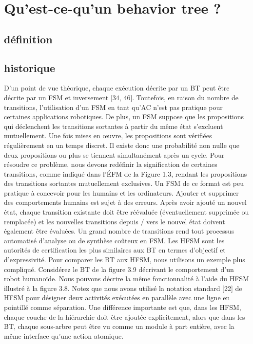 \documentclass[titlepage]{article}
\begin{document}
	\section{Qu'est-ce-qu'un behavior tree ?}
		\subsection{définition}
		\subsection{historique}
			D'un point de vue théorique, chaque exécution décrite par un BT peut être décrite par un FSM et inversement [34, 46]. Toutefois, en raison du nombre de transitions, l'utilisation d'un FSM en tant qu'AC n'est pas pratique pour certaines applications robotiques. De plus, un FSM suppose que les propositions qui déclenchent les transitions sortantes à partir du même état s’excluent mutuellement. Une fois mises en œuvre, les propositions sont vérifiées régulièrement en un temps discret. Il existe donc une probabilité non nulle que deux propositions ou plus se tiennent simultanément après un cycle. Pour résoudre ce problème, nous devons redéfinir la signification de certaines transitions, comme indiqué dans l’ÉFM de la Figure 1.3, rendant les propositions des transitions sortantes mutuellement exclusives. Un FSM de ce format est peu pratique à concevoir pour les humains et les ordinateurs. Ajouter et supprimer des comportements humains est sujet à des erreurs. Après avoir ajouté un nouvel état, chaque transition existante doit être réévaluée (éventuellement supprimée ou remplacée) et les nouvelles transitions depuis / vers le nouvel état doivent également être évaluées. Un grand nombre de transitions rend tout processus automatisé d'analyse ou de synthèse coûteux en FSM.
			Les HFSM sont les autorités de certification les plus similaires aux BT en termes d'objectif et d'expressivité. Pour comparer les BT aux HFSM, nous utilisons un exemple plus compliqué. Considérez le BT de la figure 3.9 décrivant le comportement d’un robot humanoïde. Nous pouvons décrire la même fonctionnalité à l'aide du HFSM illustré à la figure 3.8. Notez que nous avons utilisé la notation standard [22] de HFSM pour désigner deux activités exécutées en parallèle avec une ligne en pointillé comme séparation. Une différence importante est que, dans les HFSM, chaque couche de la hiérarchie doit être ajoutée explicitement, alors que dans les BT, chaque sous-arbre peut être vu comme un module à part entière, avec la même interface qu'une action atomique.
\end{document}
